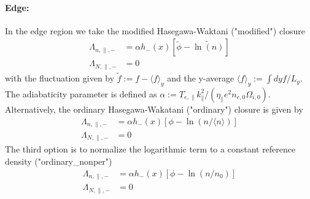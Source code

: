 \paragraph{Edge:} In the edge region we take the modified Hasegawa-Waktani ("modified")
closure~\cite{Held2018}
\begin{align}
 \Lambda_{n,\parallel,-} &= \alpha h_{-}(x) \left[\widetilde{\phi} - 
\widetilde{\ln(n)} \right] \\
 \Lambda_{N,\parallel,-} &= 0
\end{align}
with the fluctuation given by \(\widetilde{f} := f - \langle f\rangle_y\) and 
the y-average \(\langle f\rangle_y:= \int dy f / L_y\). The adiabaticity 
parameter is defined as \(\alpha := T_{e,\parallel} 
k_\parallel^2/(\eta_\parallel e^2 n_{e,0} \Omega_{i,0} )\).
\\
Alternatively, the ordinary Hasegawa-Wakatani ("ordinary") closure is given by~\cite{Held2018}
\begin{align}
 \Lambda_{n,\parallel,-} &= \alpha h_{-}(x) \left[\phi - 
\ln(n/\langle n\rangle) \right] \\
 \Lambda_{N,\parallel,-} &= 0
\end{align}
The third option is to normalize the logarithmic term to a constant reference density ("ordinary\_nonper")
\begin{align}
 \Lambda_{n,\parallel,-} &= \alpha h_{-}(x) \left[\phi - 
\ln(n/n_0) \right] \\
 \Lambda_{N,\parallel,-} &= 0
\end{align}
